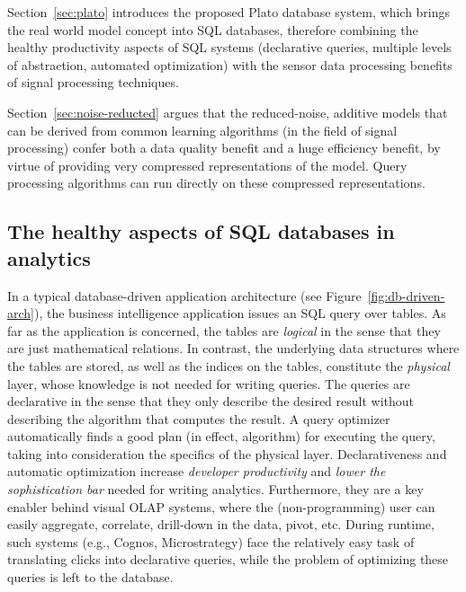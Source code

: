 
Section~\ref{sec:plato} introduces the proposed Plato database system, which brings the real world model concept into SQL databases, therefore combining the healthy productivity aspects of SQL systems (declarative queries, multiple levels of abstraction, automated optimization) with the sensor data processing benefits of signal processing techniques.

Section~\ref{sec:noise-reducted} argues that the reduced-noise, additive models that can be derived from common learning algorithms (in the field of signal processing) confer both a data quality benefit and a huge efficiency benefit, by virtue of providing very compressed representations of the model. Query processing algorithms can run directly on these compressed representations.



\subsection{The healthy aspects of SQL databases in analytics}
\label{sec:healthy-aspects}
In a typical database-driven application architecture (see Figure~\ref{fig:db-driven-arch}), the business intelligence application issues an SQL query over tables. As far as the application is concerned, the tables are {\em logical} in the sense that they are just mathematical relations. In contrast, the underlying data structures where the tables are stored, as well as the indices on the tables, constitute the {\em physical} layer, whose knowledge is not needed for writing queries. The queries are declarative in the sense that they only describe the desired result without describing the algorithm that computes the result. A query optimizer automatically finds a good plan (in effect, algorithm) for executing the query, taking into consideration the specifics of the physical layer. Declarativeness and automatic optimization increase {\em developer productivity} and {\em lower the sophistication bar} needed for writing analytics. Furthermore, they are a key enabler behind visual OLAP systems, where the (non-programming) user can easily aggregate, correlate, drill-down in the data, pivot, etc. During runtime, such systems (e.g., Cognos, Microstrategy) face the relatively easy task of translating clicks into declarative queries, while the problem of optimizing these queries is left to the database.

